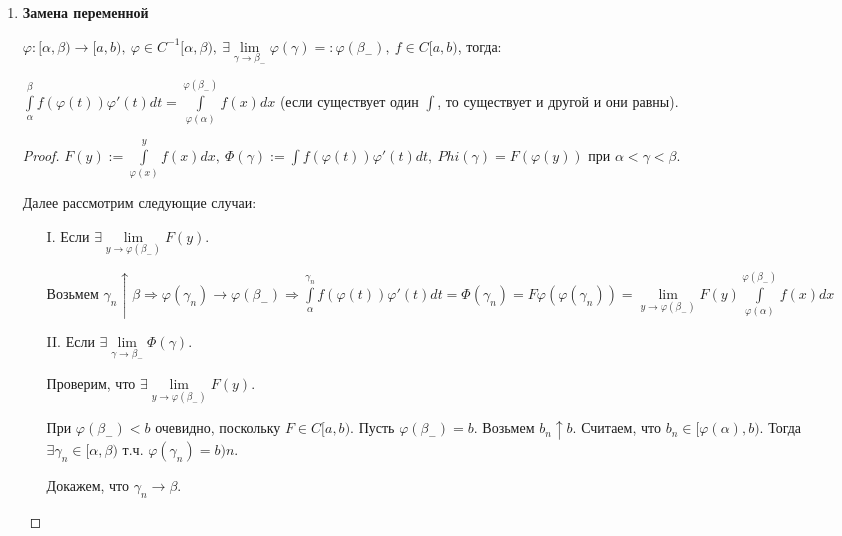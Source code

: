\begin{statement}
\begin{enumerate}
        Если $f, g\in C^{1}[a,b)$, то $\int\limits_a^b fg' = fg\left.\right|_a^{b^{\leftarrow\text{тут предел}}}-\int\limits_a^bf'g$.

        Если существует два конечных предела, то существует и третий и есть равенство.
        \begin{proof}
            $\int\limits_a^B fg' = fg\left.\right|_a^B-\int\limits_a^Bf'g$ и перейти к пределу.
        \end{proof}
        \item \textbf{Замена переменной}

        $\varphi: [\alpha, \beta)\rightarrow [a, b),\ \varphi\in C^{-1}[\alpha, \beta),\ \exists \lim\limits_{\gamma \rightarrow \beta_-}\varphi(\gamma)=:\varphi(\beta_-),\ f\in C[a,b)$, тогда:

        $\int\limits_\alpha^\beta f(\varphi(t))\varphi'(t)dt=\int\limits_{\varphi(\alpha)}^{\varphi(\beta_-)}f(x)dx$ (если существует один $\int$, то существует и другой и они равны).

        \begin{proof}
            $F(y):=\int\limits_{\varphi(x)}^y f(x)dx,\ \Phi(\gamma):=\int\limits f(\varphi(t))\varphi'(t)dt,\ Phi(\gamma)=F(\varphi(y))$ при $\alpha<\gamma<\beta$.

            Далее рассмотрим следующие случаи: 
            \begin{enumerate}
                \item[I.] Если $\exists \lim\limits_{y\rightarrow \varphi (\beta_-)} F(y)$.

                Возьмем $\gamma_n\uparrow \beta\Rightarrow \varphi(\gamma_n)\rightarrow \varphi(\beta_-)\Rightarrow \int\limits_{\alpha}^{\gamma_n}f(\varphi(t))\varphi'(t)dt=\Phi (\gamma_n)=F\varphi(\varphi(\gamma_n))=\lim\limits_{y\rightarrow \varphi(\beta_-)} F(y)\int\limits_{\varphi(\alpha)}^{\varphi(\beta_-)}f(x)dx$

                \item[II.] Если $\exists \lim\limits_{\gamma\rightarrow \beta_-} \Phi(\gamma)$.

                Проверим, что $\exists \lim\limits_{y\rightarrow \varphi(\beta_-)} F(y)$.

                При $\varphi(\beta_-)<b$ очевидно, поскольку $F\in C[a,b)$. Пусть $\varphi(\beta_-)=b$. Возьмем $b_n\uparrow b$. Считаем, что $b_n\in [\varphi(\alpha),b)$. Тогда $\exists \gamma_n\in [\alpha, \beta)$ т.ч. $\varphi(\gamma_n)=b)n$. 
                
                Докажем, что $\gamma_n\rightarrow \beta$. 
                

\end{enumerate}
\end{proof}
\end{enumerate}
\end{statement}
